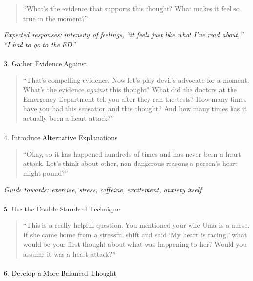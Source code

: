 \documentclass[
  american,
  letterpaper,
  DIV=11,
  numbers=noendperiod]{scrartcl}
\makeatletter
\let\oldparagraph\paragraph
\renewcommand{\paragraph}{
    \@ifstar
      \xxxParagraphStar
      \xxxParagraphNoStar
  }
\newcommand{\xxxParagraphStar}[1]{\oldparagraph*{#1}\mbox{}}
\newcommand{\xxxParagraphNoStar}[1]{\oldparagraph{#1}\mbox{}}
\makeatother
\begin{document}
\begin{quote}
``What's the evidence that supports this thought? What makes it feel so
true in the moment?''
\end{quote}

\emph{Expected responses: intensity of feelings, ``it feels just like
what I've read about,'' ``I had to go to the ED''}

\paragraph{3. Gather Evidence Against}\label{gather-evidence-against}

\begin{quote}
``That's compelling evidence. Now let's play devil's advocate for a
moment. What's the evidence \emph{against} this thought? What did the
doctors at the Emergency Department tell you after they ran the tests?
How many times have you had this sensation and this thought? And how
many times has it actually been a heart attack?''
\end{quote}

\paragraph{4. Introduce Alternative
Explanations}\label{introduce-alternative-explanations}

\begin{quote}
``Okay, so it has happened hundreds of times and has never been a heart
attack. Let's think about other, non-dangerous reasons a person's heart
might pound?''
\end{quote}

\emph{Guide towards: exercise, stress, caffeine, excitement, anxiety
itself}

\paragraph{5. Use the Double Standard
Technique}\label{use-the-double-standard-technique}

\begin{quote}
``This is a really helpful question. You mentioned your wife Uma is a
nurse. If she came home from a stressful shift and said `My heart is
racing,' what would be your first thought about what was happening to
her? Would you assume it was a heart attack?''
\end{quote}

\paragraph{6. Develop a More Balanced
Thought}\label{develop-a-more-balanced-thought}
\end{document}
